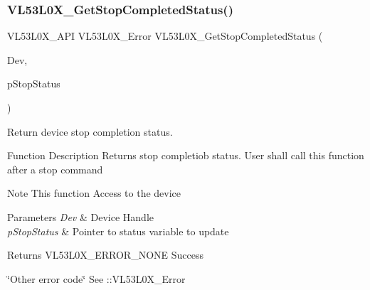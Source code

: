 \subsubsection{\texorpdfstring{V\+L53\+L0\+X\+\_\+\+Get\+Stop\+Completed\+Status()}{VL53L0X\_GetStopCompletedStatus()}}
{\footnotesize\ttfamily V\+L53\+L0\+X\+\_\+\+A\+PI V\+L53\+L0\+X\+\_\+\+Error V\+L53\+L0\+X\+\_\+\+Get\+Stop\+Completed\+Status (\begin{DoxyParamCaption}\item[{\hyperlink{group__VL53L0X__platform__group_ga2d6405308b1dd524b462f1b8fb97d167}{V\+L53\+L0\+X\+\_\+\+D\+EV}}]{Dev,  }\item[{\hyperlink{vl53l0x__types_8h_a435d1572bf3f880d55459d9805097f62}{uint32\+\_\+t} $\ast$}]{p\+Stop\+Status }\end{DoxyParamCaption})}



Return device stop completion status. 

\begin{DoxyParagraph}{Function Description}
Returns stop completiob status. User shall call this function after a stop command
\end{DoxyParagraph}
\begin{DoxyNote}{Note}
This function Access to the device
\end{DoxyNote}

\begin{DoxyParams}{Parameters}
{\em Dev} & Device Handle \\
\hline
{\em p\+Stop\+Status} & Pointer to status variable to update \\
\hline
\end{DoxyParams}
\begin{DoxyReturn}{Returns}
V\+L53\+L0\+X\+\_\+\+E\+R\+R\+O\+R\+\_\+\+N\+O\+NE Success 

\char`\"{}\+Other error code\char`\"{} See \+::\+V\+L53\+L0\+X\+\_\+\+Error 
\end{DoxyReturn}
\mbox{\label{group__VL53L0X__interrupt__group_ga8793fb3c70a2c297247a103e1b446f49}} 
